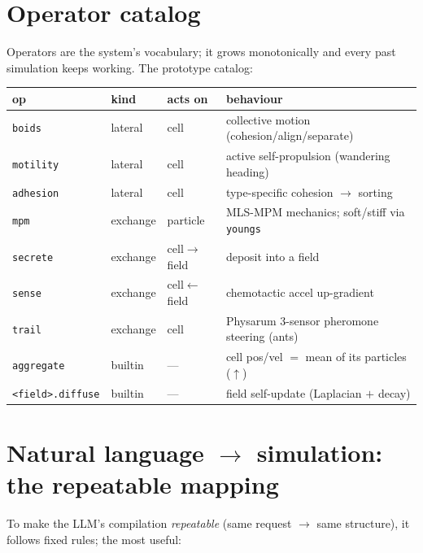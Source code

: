 \documentclass[11pt]{article}
\newcommand{\code}[1]{\texttt{#1}}
\begin{document}
\section{Operator catalog}

Operators are the system's vocabulary; it grows monotonically and every past
simulation keeps working. The prototype catalog:

\begin{center}
\renewcommand{\arraystretch}{1.15}
\begin{tabular}{@{}llll@{}}
\toprule
\textbf{op} & \textbf{kind} & \textbf{acts on} & \textbf{behaviour} \\
\midrule
\code{boids}    & lateral   & cell        & collective motion (cohesion/align/separate) \\
\code{motility} & lateral   & cell        & active self-propulsion (wandering heading) \\
\code{adhesion} & lateral   & cell        & type-specific cohesion $\to$ sorting \\
\code{mpm}      & exchange  & particle    & MLS-MPM mechanics; soft/stiff via \code{youngs} \\
\code{secrete}  & exchange  & cell$\to$field & deposit into a field \\
\code{sense}    & exchange  & cell$\leftarrow$field & chemotactic accel up-gradient \\
\code{trail}    & exchange  & cell        & Physarum 3-sensor pheromone steering (ants) \\
\code{aggregate}& builtin   & ---         & cell pos/vel $=$ mean of its particles ($\uparrow$) \\
\code{<field>.diffuse} & builtin & ---    & field self-update (Laplacian $+$ decay) \\
\bottomrule
\end{tabular}
\end{center}

\section{Natural language $\to$ simulation: the repeatable mapping}

To make the LLM's compilation \emph{repeatable} (same request $\to$ same
structure), it follows fixed rules; the most useful:
\end{document}
